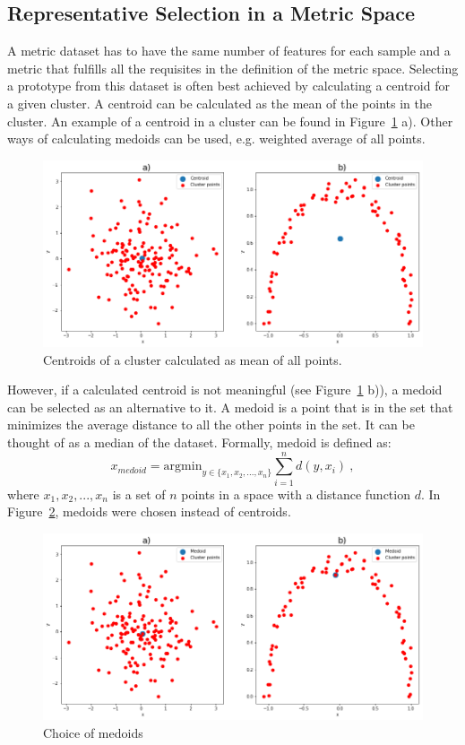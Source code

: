 \documentclass[thesis=B,english]{FITthesis}[2012/10/20]
\begin{document}
\subsection{Representative Selection in a Metric Space}\label{sec:rep_select_metric}
A metric dataset has to have the same number of features for each sample and a metric that fulfills all the requisites in the definition of the metric space.
Selecting a prototype from this dataset is often best achieved by calculating a centroid for a given cluster.
A centroid can be calculated as the mean of the points in the cluster.
An example of a centroid in a cluster can be found in Figure~\ref{img:centroids} a).
Other ways of calculating medoids can be used, e.g. weighted average of all points.

\begin{figure}
  \includegraphics[width=\linewidth]{img/centroids.png}
  \caption{Centroids of a cluster calculated as mean of all points.}
  \label{img:centroids}
\end{figure}

However, if a calculated centroid is not meaningful (see Figure~\ref{img:centroids} b)), a medoid can be selected as an alternative to it.
A medoid is a point that is in the set that minimizes the average distance to all the other points in the set.
It can be thought of as a median of the dataset.
Formally, medoid is defined as:
\begin{equation}
x_{medoid} = \mathrm{argmin}_{y \in \{x_1, x_2, ..., x_n\}} \sum_{i=1}^{n}{d(y, x_i)}\:, \tag{5}
\end{equation} 
where $x_1, x_2, ..., x_n$ is a set of $n$ points in a space with a distance function $d$.
In Figure~\ref{img:medoids}, medoids were chosen instead of centroids.
\begin{figure}
  \includegraphics[width=\linewidth]{img/medoids.png}
  \caption{Choice of medoids}
  \label{img:medoids}
\end{figure}
\end{document}

